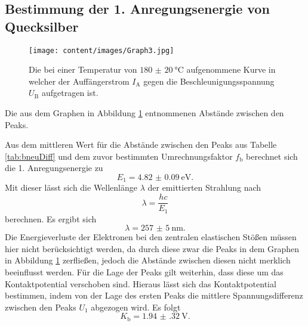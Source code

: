 \subsection{Bestimmung der 1. Anregungsenergie von Quecksilber}
\label{subsec:Bestimmung_der_1._Anregungsenergie_von_Quecksilber}
\begin{figure}
	\centering
	\caption{Die bei einer Temperatur von $\SI{180(20)}{\degreeCelsius}$ aufgenommene Kurve in welcher der Auffängerstrom $I_\text{A}$ gegen die Beschleunigungsspannung $U_\text{B}$ aufgetragen ist.}
	\texttt{[image: content/images/Graph3.jpg]}
	\label{fig:b}
\end{figure}
\begin{table}
	\caption{Die aus dem Graphen in Abbildung \ref{fig:b} entnommenen Abstände zwischen den Peaks.}
	\centering
	
\end{table}
Aus dem mittleren Wert für die Abstände zwischen den Peaks aus Tabelle \ref{tab:bneuDiff} und dem zuvor bestimmten Umrechnungsfaktor $f_\text{b}$ berechnet sich die 1. Anregungsenergie zu
\begin{displaymath}
	E_1=\SI{4.82(9)}{\electronvolt}\text{.}
\end{displaymath}
Mit dieser lässt sich die Wellenlänge $\lambda$ der emittierten Strahlung nach
\begin{equation}
\lambda = \frac{h  c}{E_1}
\end{equation}
berechnen.
Es ergibt sich
\begin{displaymath}
\lambda=\SI{257(5)}{\nano\meter}\text{.}
\end{displaymath}
Die Energieverluste der Elektronen bei den zentralen elastischen Stößen müssen hier nicht berücksichtigt werden, da durch diese zwar die Peaks in dem Graphen in Abbildung \ref{fig:b} zerfließen, jedoch die Abstände zwischen diesen nicht merklich beeinflusst werden. Für die Lage der Peaks gilt weiterhin, dass diese um das Kontaktpotential verschoben sind. Hieraus lässt sich das Kontaktpotential bestimmen, indem von der Lage des ersten Peaks die mittlere Spannungsdifferenz zwischen den Peaks $U_1$ abgezogen wird. Es folgt
\begin{displaymath}
K_\text{b}=\SI{1.94(32)}{\volt}\text{.}
\end{displaymath}


